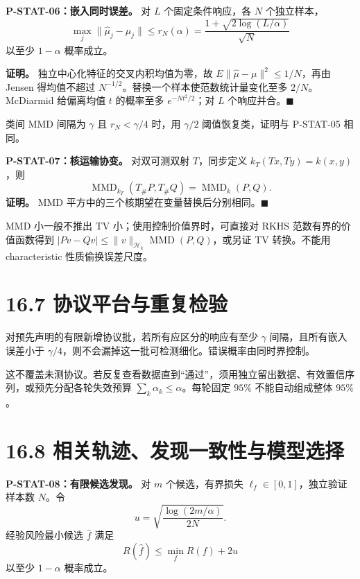 \documentclass[
  11pt,
  oneside]{book}
\begin{document}
\hypertarget{p-stat-06}{}\label{p-stat-06}

\textbf{P-STAT-06：嵌入同时误差。} 对 \(L\) 个固定条件响应，各 \(N\) 个独立样本， \[\max_j\|\widehat\mu_j-\mu_j\|
\le r_N(\alpha)=
\frac{1+\sqrt{2\log(L/\alpha)}}{\sqrt N}\] 以至少 \(1-\alpha\) 概率成立。

\textbf{证明。} 独立中心化特征的交叉内积均值为零，故 \(E\|\widehat\mu-\mu\|^2\le1/N\)，再由 Jensen 得均值不超过 \(N^{-1/2}\)。替换一个样本使范数统计量变化至多 \(2/N\)。McDiarmid 给偏离均值 \(t\) 的概率至多 \(e^{-Nt^2/2}\)；对 \(L\) 个响应并合。\(\blacksquare\)

类间 MMD 间隔为 \(\gamma\) 且 \(r_N<\gamma/4\) 时，用 \(\gamma/2\) 阈值恢复类，证明与 P-STAT-05 相同。

\hypertarget{p-stat-07}{}\label{p-stat-07}

\textbf{P-STAT-07：核运输协变。} 对双可测双射 \(T\)，同步定义 \(k_T(Tx,Ty)=k(x,y)\)，则 \[\operatorname{MMD}_{k_T}(T_\#P,T_\#Q)
=\operatorname{MMD}_k(P,Q).\] \textbf{证明。} MMD 平方中的三个核期望在变量替换后分别相同。\(\blacksquare\)

MMD 小一般不推出 TV 小；使用控制价值界时，可直接对 RKHS 范数有界的价值函数得到 \(|Pv-Qv|\le\|v\|_{\mathcal H_k}\operatorname{MMD}(P,Q)\)，或另证 TV 转换。不能用 characteristic 性质偷换误差尺度。

\section{16.7 协议平台与重复检验}\label{ux534fux8baeux5e73ux53f0ux4e0eux91cdux590dux68c0ux9a8c}

对预先声明的有限新增协议批，若所有应区分的响应有至少 \(\gamma\) 间隔，且所有嵌入误差小于 \(\gamma/4\)，则不会漏掉这一批可检测细化。错误概率由同时界控制。

这不覆盖未测协议。若反复查看数据直到``通过''，须用独立留出数据、有效置信序列，或预先分配各轮失效预算 \(\sum_k\alpha_k\le\alpha\)。每轮固定 \(95\%\) 不能自动组成整体 \(95\%\)。

\section{16.8 相关轨迹、发现一致性与模型选择}\label{ux76f8ux5173ux8f68ux8ff9ux53d1ux73b0ux4e00ux81f4ux6027ux4e0eux6a21ux578bux9009ux62e9}

\hypertarget{p-stat-08}{}\label{p-stat-08}

\textbf{P-STAT-08：有限候选发现。} 对 \(m\) 个候选，有界损失 \(\ell_f\in[0,1]\)，独立验证样本数 \(N\)。令 \[u=\sqrt{\frac{\log(2m/\alpha)}{2N}}.\] 经验风险最小候选 \(\widehat f\) 满足 \[R(\widehat f)\le\min_fR(f)+2u\] 以至少 \(1-\alpha\) 概率成立。
\end{document}
